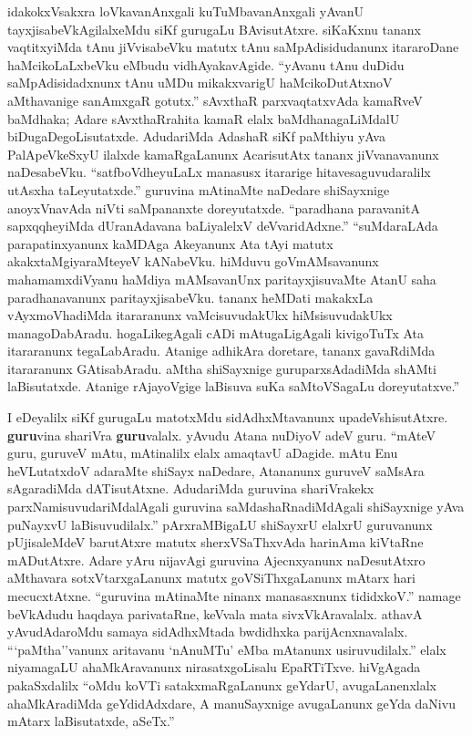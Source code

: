 idakokxVsakxra loVkavanAnxgali kuTuMbavanAnxgali yAvanU tayxjisabeVkAgilalx\break eMdu siKf gurugaLu BAvisutAtxre. siKaKxnu tananx vaqtitxyiMda tAnu jiVvisabeVku matutx tAnu saMpAdisidudanunx itararoDane haMcikoLaLxbeVku eMbudu vidhAyaka\-vAgide. ``yAvanu tAnu duDidu saMpAdisidadxnunx tAnu uMDu mikakxvarigU haMcikoDutAtxnoV aMthavanige sanAmxgaR gotutx.'' sAvxthaR parxvaqtatxvAda kamaRveV baMdhaka; Adare sAvxthaRrahita kamaR elalx baMdhanagaLiMdalU biDugaDegoLisutatxde. AdudariMda AdashaR siKf paMthiyu yAva PalApeVkeSxyU ilalxde kamaRgaLanunx AcarisutAtx tananx jiVvanavanunx naDesabeVku. ``satfboVdheyuLaLx manasusx itararige hitavesaguvudaralilx utAsxha taLeyutatxde.'' guruvina mAtinaMte naDedare shiSayxnige anoyxVnavAda niVti saMpananxte doreyutatxde. ``paradhana paravanitA sapxqqheyiMda dUranAdavana baLiyalelxV deVvaridAdxne.'' ``suMdaraLAda parapatinxyanunx kaMDAga Akeyanunx Ata tAyi matutx akakxtaMgiyaraMteyeV kANabeVku. hiMduvu goVmAMsavanunx mahamamxdiVyanu haMdiya mAMsavanUnx paritayxjisuvaMte AtanU saha paradhanavanunx paritayxjisabeVku. tananx heMDati makakxLa vAyxmoVhadiMda itararanunx vaMcisuvudakUkx hiMsisuvudakUkx managoDabAradu. hogaLikegAgali cADi mAtugaLigAgali kivigoTuTx Ata itararanunx tegaLabAradu. Atanige adhikAra doretare, tananx gavaRdiMda itararanunx GAtisabAradu. aMtha shiSayxnige guruparxsAdadiMda shAMti laBisutatxde. Atanige rAjayoVgige laBisuva suKa saMtoVSagaLu doreyutatxve.''

I eDeyalilx siKf gurugaLu matotxMdu sidAdhxMtavanunx upadeVshisutAtxre. {\bf guru}vina shariVra {\bf guru}valalx. yAvudu Atana nuDiyoV adeV guru. ``mAteV guru, guruveV mAtu, mAtinalilx elalx amaqtavU aDagide. mAtu Enu heVLutatxdoV adaraMte shiSayx naDedare, Atananunx guruveV saMsAra sAgaradiMda dATisutAtxne. AdudariMda guruvina shariVrakekx parxNamisuvudariMdalAgali guruvina saMdashaRnadiMdAgali shiSayxnige yAva puNayxvU laBisuvudilalx.'' pArxraMBigaLU shiSayxrU elalxrU guruvanunx pUjisaleMdeV barutAtxre matutx sherxVSaThxvAda harinAma kiVtaRne mADutAtxre. Adare yAru nijavAgi guruvina Ajecnxyanunx naDesutAtxro aMthavara sotxVtarxgaLanunx matutx goVSiThxgaLanunx mAtarx hari mecucxtAtxne. ``guruvina mAtinaMte ninanx manasasxnunx tididxkoV.'' namage beVkAdudu haqdaya parivataRne, keVvala mata sivxVkAravalalx. athavA yAvudAdaroMdu samaya sidAdhxMtada bwdidhxka parijAcnxnavalalx. ```paMtha''vanunx aritavanu `nAnuMTu' eMba mAtanunx usiruvudilalx.'' elalx niyamagaLU ahaMkAravanunx nirasatxgoLisalu EpaRTiTxve. hiVgAgada pakaSxdalilx ``oMdu koVTi satakxmaRgaLanunx geYdarU, avugaLanenxlalx ahaMkAradiMda geYdidAdxdare, A manuSayxnige avugaLanunx geYda daNivu mAtarx laBisutatxde, aSeTx.''

